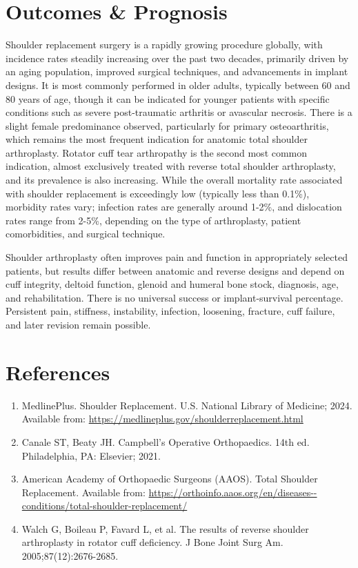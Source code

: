 \section*{Outcomes \& Prognosis}
Shoulder replacement surgery is a rapidly growing procedure globally, with incidence rates steadily increasing over the past two decades, primarily driven by an aging population, improved surgical techniques, and advancements in implant designs. It is most commonly performed in older adults, typically between 60 and 80 years of age, though it can be indicated for younger patients with specific conditions such as severe post-traumatic arthritis or avascular necrosis. There is a slight female predominance observed, particularly for primary osteoarthritis, which remains the most frequent indication for anatomic total shoulder arthroplasty. Rotator cuff tear arthropathy is the second most common indication, almost exclusively treated with reverse total shoulder arthroplasty, and its prevalence is also increasing. While the overall mortality rate associated with shoulder replacement is exceedingly low (typically less than 0.1\%), morbidity rates vary; infection rates are generally around 1-2\%, and dislocation rates range from 2-5\%, depending on the type of arthroplasty, patient comorbidities, and surgical technique.

Shoulder arthroplasty often improves pain and function in appropriately selected patients, but results differ between anatomic and reverse designs and depend on cuff integrity, deltoid function, glenoid and humeral bone stock, diagnosis, age, and rehabilitation. There is no universal success or implant-survival percentage. Persistent pain, stiffness, instability, infection, loosening, fracture, cuff failure, and later revision remain possible.

\section*{References}
\begin{enumerate}
  \item MedlinePlus. Shoulder Replacement. U.S. National Library of Medicine; 2024. Available from: \url{https://medlineplus.gov/shoulderreplacement.html}
  \item Canale ST, Beaty JH. Campbell's Operative Orthopaedics. 14th ed. Philadelphia, PA: Elsevier; 2021.
  \item American Academy of Orthopaedic Surgeons (AAOS). Total Shoulder Replacement. Available from: \url{https://orthoinfo.aaos.org/en/diseases--conditions/total-shoulder-replacement/}
  \item Walch G, Boileau P, Favard L, et al. The results of reverse shoulder arthroplasty in rotator cuff deficiency. J Bone Joint Surg Am. 2005;87(12):2676-2685.
\end{enumerate}

\clearpage
